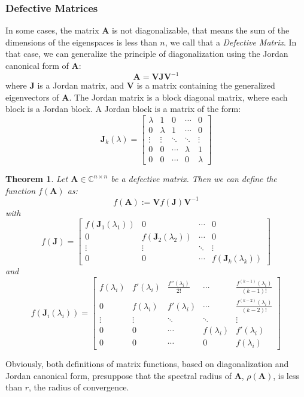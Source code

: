 \documentclass[12pt]{article}
\newtheorem{theorem}{Theorem}
\begin{document}
\subsubsection*{Defective Matrices}
In some cases, the matrix $\mathbf{A}$ is not diagonalizable, that means the sum of the dimensions of the eigenspaces is less than $n$, we call that a \textit{Defective Matrix}. In that case, we can generalize the principle of diagonalization using the Jordan canonical form of $\mathbf{A}$:
\begin{equation}
    \mathbf{A} = \mathbf{V}\mathbf{J}\mathbf{V}^{-1}
\end{equation}
where $\mathbf{J}$ is a Jordan matrix, and $\mathbf{V}$ is a matrix containing the generalized eigenvectors of $\mathbf{A}$. The Jordan matrix is a block diagonal matrix, where each block is a Jordan block. A Jordan block is a matrix of the form:
\begin{equation}
    \mathbf{J}_k(\lambda) = \begin{bmatrix}
        \lambda & 1 & 0 & \cdots & 0 \\
        0 & \lambda & 1 & \cdots & 0 \\
        \vdots & \vdots & \ddots & \ddots & \vdots \\
        0 & 0 & \cdots & \lambda & 1 \\
        0 & 0 & \cdots & 0 & \lambda
    \end{bmatrix}
\end{equation}
\begin{theorem}
    Let $\mathbf{A}\in\mathbb{C}^{n\times n}$ be a defective matrix. Then we can define the function $f(\mathbf{A})$ as:
    \begin{equation}
        f(\mathbf{A}) := \mathbf{V}f(\mathbf{J})\mathbf{V}^{-1}
    \end{equation}
    with 
    \begin{equation}
        f(\mathbf{J}) = \begin{bmatrix}
            f(\mathbf{J}_1(\lambda_1)) & 0 & \cdots & 0 \\
            0 & f(\mathbf{J}_2(\lambda_2)) & \cdots & 0 \\
            \vdots & \vdots & \ddots & \vdots \\
            0 & 0 & \cdots & f(\mathbf{J}_k(\lambda_k))
        \end{bmatrix}
    \end{equation}
    and \begin{equation}
        f(\mathbf{J}_i(\lambda_i)) = \begin{bmatrix}
            f(\lambda_i) & f'(\lambda_i) & \frac{f''(\lambda_i)}{2!} & \cdots & \frac{f^{(k-1)}(\lambda_i)}{(k-1)!} \\
            0 & f(\lambda_i) & f'(\lambda_i) & \cdots & \frac{f^{(k-2)}(\lambda_i)}{(k-2)!} \\
            \vdots & \vdots & \ddots & \ddots & \vdots \\
            0 & 0 & \cdots & f(\lambda_i) & f'(\lambda_i) \\
            0 & 0 & \cdots & 0 & f(\lambda_i)
        \end{bmatrix}
    \end{equation}
\end{theorem}
Obviously, both definitions of matrix functions, based on diagonalization and Jordan canonical form, presuppose that the spectral radius of $\mathbf{A}$, $\rho(\mathbf{A})$, is less than $r$, the radius of convergence.
\printbibliography
\end{document}
